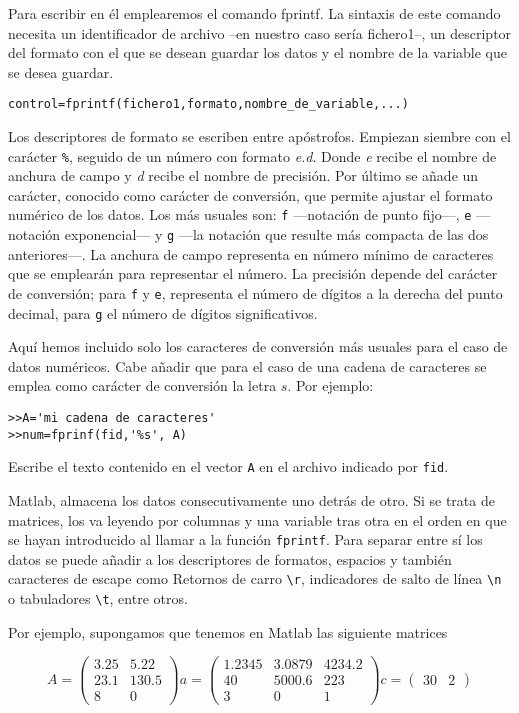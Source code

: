 Para escribir en él emplearemos el comando fprintf. La sintaxis de este comando necesita un identificador de archivo --en nuestro caso sería fichero1--, un descriptor del formato con el que se desean guardar los datos y el nombre de la variable que se desea guardar.
\begin{verbatim}
control=fprintf(fichero1,formato,nombre_de_variable,...)
\end{verbatim} 
Los descriptores de formato se escriben entre apóstrofos. Empiezan siembre con el carácter \texttt{\%}, seguido de un número con formato \emph{e.d}. Donde \emph{e} recibe el nombre de anchura de campo  y \emph{d} recibe el nombre de precisión. Por último se añade un carácter, conocido como carácter de conversión, que permite ajustar el formato numérico de los datos. Los más usuales son: \texttt{f} ---notación de punto fijo---, \texttt{e} ---notación exponencial--- y \texttt{g} ---la notación que resulte más compacta de las dos anteriores---.  La anchura de campo representa en número mínimo de caracteres que se emplearán para representar el número.  La precisión depende del carácter de conversión; para \texttt{f} y  \texttt{e}, representa el número de dígitos  a la derecha del punto decimal, para  \texttt{g} el número de dígitos significativos.

Aquí hemos incluido solo los caracteres de conversión más usuales para el caso de datos numéricos. Cabe añadir que para el caso de una cadena de caracteres se emplea como carácter de conversión la letra $s$.  Por ejemplo:

\begin{verbatim}
>>A='mi cadena de caracteres'
>>num=fprinf(fid,'%s', A)
\end{verbatim}
Escribe  el texto contenido en el vector \texttt{A} en el archivo indicado por \texttt{fid}.
 
Matlab, almacena los datos consecutivamente uno detrás de otro. Si se trata de matrices, los va leyendo por columnas y una variable tras otra en el orden en que se hayan introducido al llamar a la función \texttt{fprintf}. Para separar entre sí los datos se puede añadir a los descriptores de formatos, espacios y también caracteres de escape como Retornos de carro \texttt{\textbackslash r}, indicadores de salto de línea \texttt{\textbackslash n} o tabuladores \texttt{\textbackslash t}, entre otros.

Por ejemplo, supongamos que tenemos en Matlab las siguiente matrices

 \begin{equation*}
 A=
 \begin{pmatrix}
3.25&5.22\\
23.1&130.5\\
8&0
\end{pmatrix}
a=
\begin{pmatrix}
1.2345&3.0879&4234.2\\
40&5000.6&223\\
3&0&1
\end{pmatrix}
c=
\begin{pmatrix}
30&2
\end{pmatrix}
\end{equation*}

